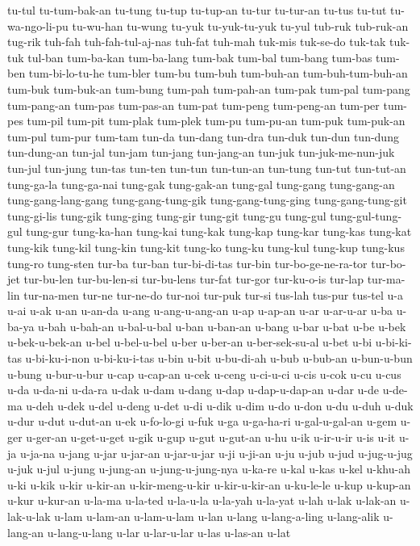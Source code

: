 {tu-tul tu-tum-bak-an tu-tung tu-tup tu-tup-an tu-tur tu-tur-an tu-tus
tu-tut tu-wa-ngo-li-pu tu-wu-han tu-wung tu-yuk tu-yuk-tu-yuk tu-yul
tub-ruk tub-ruk-an tug-rik tuh-fah tuh-fah-tul-aj-nas tuh-fat tuh-mah
tuk-mis tuk-se-do tuk-tak tuk-tuk tul-ban tum-ba-kan tum-ba-lang tum-bak
tum-bal tum-bang tum-bas tum-ben tum-bi-lo-tu-he tum-bler tum-bu tum-buh
tum-buh-an tum-buh-tum-buh-an tum-buk tum-buk-an tum-bung tum-pah
tum-pah-an tum-pak tum-pal tum-pang tum-pang-an tum-pas tum-pas-an tum-pat
tum-peng tum-peng-an tum-per tum-pes tum-pil tum-pit tum-plak tum-plek
tum-pu tum-pu-an tum-puk tum-puk-an tum-pul tum-pur tum-tam tun-da
tun-dang tun-dra tun-duk tun-dun tun-dung tun-dung-an tun-jal tun-jam
tun-jang tun-jang-an tun-juk tun-juk-me-nun-juk tun-jul tun-jung tun-tas
tun-ten tun-tun tun-tun-an tun-tung tun-tut tun-tut-an tung-ga-la
tung-ga-nai tung-gak tung-gak-an tung-gal tung-gang tung-gang-an
tung-gang-lang-gang tung-gang-tung-gik tung-gang-tung-ging
tung-gang-tung-git tung-gi-lis tung-gik tung-ging tung-gir tung-git
tung-gu tung-gul tung-gul-tung-gul tung-gur tung-ka-han tung-kai tung-kak
tung-kap tung-kar tung-kas tung-kat tung-kik tung-kil tung-kin tung-kit
tung-ko tung-ku tung-kul tung-kup tung-kus tung-ro tung-sten tur-ba
tur-ban tur-bi-di-tas tur-bin tur-bo-ge-ne-ra-tor tur-bo-jet tur-bu-len
tur-bu-len-si tur-bu-lens tur-fat tur-gor tur-ku-o-is tur-lap tur-ma-lin
tur-na-men tur-ne tur-ne-do tur-noi tur-puk tur-si tus-lah tus-pur tus-tel
u-a u-ai u-ak u-an u-an-da u-ang u-ang-u-ang-an u-ap u-ap-an u-ar
u-ar-u-ar u-ba u-ba-ya u-bah u-bah-an u-bal-u-bal u-ban u-ban-an u-bang
u-bar u-bat u-be u-bek u-bek-u-bek-an u-bel u-bel-u-bel u-ber u-ber-an
u-ber-sek-su-al u-bet u-bi u-bi-ki-tas u-bi-ku-i-non u-bi-ku-i-tas u-bin
u-bit u-bu-di-ah u-bub u-bub-an u-bun-u-bun u-bung u-bur-u-bur u-cap
u-cap-an u-cek u-ceng u-ci-u-ci u-cis u-cok u-cu u-cus u-da u-da-ni
u-da-ra u-dak u-dam u-dang u-dap u-dap-u-dap-an u-dar u-de u-de-ma u-deh
u-dek u-del u-deng u-det u-di u-dik u-dim u-do u-don u-du u-duh u-duk
u-dur u-dut u-dut-an u-ek u-fo-lo-gi u-fuk u-ga u-ga-ha-ri u-gal-u-gal-an
u-gem u-ger u-ger-an u-get-u-get u-gik u-gup u-gut u-gut-an u-hu u-ik
u-ir-u-ir u-is u-it u-ja u-ja-na u-jang u-jar u-jar-an u-jar-u-jar u-ji
u-ji-an u-ju u-jub u-jud u-jug-u-jug u-juk u-jul u-jung u-jung-an
u-jung-u-jung-nya u-ka-re u-kal u-kas u-kel u-khu-ah u-ki u-kik u-kir
u-kir-an u-kir-meng-u-kir u-kir-u-kir-an u-ku-le-le u-kup u-kup-an u-kur
u-kur-an u-la-ma u-la-ted u-la-u-la u-la-yah u-la-yat u-lah u-lak u-lak-an
u-lak-u-lak u-lam u-lam-an u-lam-u-lam u-lan u-lang u-lang-a-ling
u-lang-alik u-lang-an u-lang-u-lang u-lar u-lar-u-lar u-las u-las-an u-lat
}
